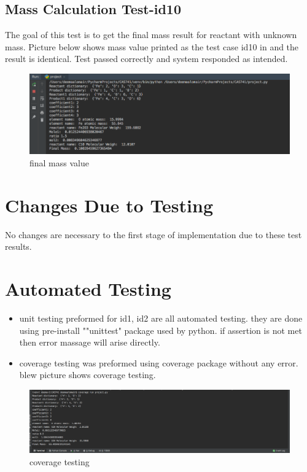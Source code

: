 \documentclass[12pt, titlepage]{article}
\begin{document}
\subsection{Mass Calculation Test-id10}

The goal of this test is to get the final mass result for reactant with unknown mass. Picture below shows mass value printed as the test case id10 in \cite{SystemVnVPlan} and the result is identical. Test passed correctly and system responded as intended.

\begin{figure}[H]
 \begin{center}
 \includegraphics [width=\textwidth]{mass2}
 \caption{\label{ Figure 12:} final mass value}
 \end{center}
 \end{figure}

\section{Changes Due to Testing}

No changes are necessary to the first stage of implementation due to these test results.

\section{Automated Testing}

\begin{itemize}
\item unit testing preformed for id1, id2 are all automated testing. they are done using pre-install ""unittest" package used by python. if assertion is not met then error massage will arise directly. 
\item coverage testing was preformed using coverage package without any error. blew picture shows coverage testing.
\end{itemize}

\begin{figure}[H]
 \begin{center}
 \includegraphics [width=\textwidth]{coverage}
 \caption{\label{ Figure 13:} coverage testing}
 \end{center}
 \end{figure}
\end{document}

